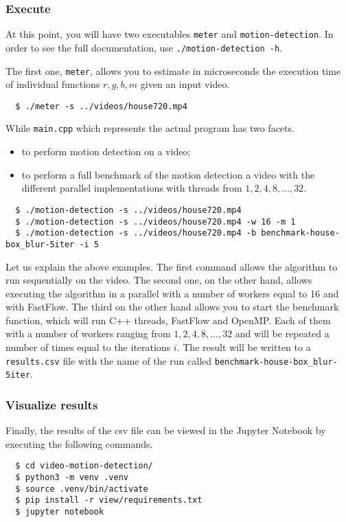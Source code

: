 \subsubsection{Execute}
At this point, you will have two executables \texttt{meter} and \texttt{motion-detection}. In order to see the full documentation, use \texttt{./motion-detection -h}.

The first one, \texttt{meter}, allows you to estimate in microseconds the execution time of individual functions $r,g,b,m$ given an input video.
\begin{verbatim}
  $ ./meter -s ../videos/house720.mp4
\end{verbatim}

While \texttt{main.cpp} which represents the actual program has two facets.
\begin{itemize}
    \item to perform motion detection on a video;
    \item to perform a full benchmark of the motion detection a video with the different parallel implementations with threads from $1,2,4,8,\ldots,32$.
\end{itemize}
\begin{verbatim}
  $ ./motion-detection -s ../videos/house720.mp4
  $ ./motion-detection -s ../videos/house720.mp4 -w 16 -m 1
  $ ./motion-detection -s ../videos/house720.mp4 -b benchmark-house-box_blur-5iter -i 5
\end{verbatim}
Let us explain the above examples.
The first command allows the algorithm to run sequentially on the video.
The second one, on the other hand, allows executing the algorithm in a parallel with a number of workers equal to 16 and with FastFlow.
The third on the other hand allows you to start the benchmark function, which will run C++ threads, FastFlow and OpenMP. Each of them with a number of workers ranging from $1,2,4,8,\ldots,32$ and will be repeated a number of times equal to the iterations $i$. The result will be written to a \texttt{results.csv} file with the name of the run called \texttt{benchmark-house-box_blur-5iter}.

\subsubsection{Visualize results}
Finally, the results of the csv file can be viewed in the Jupyter Notebook by executing the following commands.
\begin{verbatim}
  $ cd video-motion-detection/
  $ python3 -m venv .venv
  $ source .venv/bin/activate
  $ pip install -r view/requirements.txt
  $ jupyter notebook
\end{verbatim}
